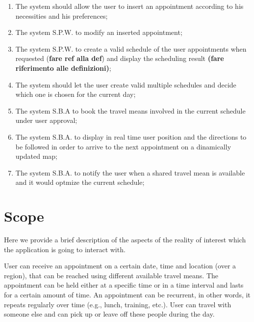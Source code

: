 \begin{enumerate}
\item The system should allow the user to insert an appointment according to his necessities and his preferences;
\label{goal:G1}

\item The system S.P.W. to modify an inserted appointment;
\label{goal:G2} 

\item The system S.P.W. to create a valid schedule of the user appointments when requested (\textbf{fare ref alla def}) and display the scheduling result \textbf{(fare riferimento alle definizioni)};
\label{goal:G3}

\item The system should let the user create valid multiple schedules and decide which one is chosen for the current day;
\label{goal:G4}

\item The system S.B.A to book the travel means involved in the current schedule under user approval;
\label{goal:G7} 

\item The system S.B.A. to display in real time user position and the directions to be followed in order to arrive to the next appointment on a dinamically updated map; \label{G8}

\item The system S.B.A. to notify the user when a shared travel mean is available and it would optmize the current schedule; \label{G10}

\end{enumerate}


\section{Scope}

Here we provide a brief description of the aspects of the reality of interest which the application is going to interact with.

User can receive an appointment on a certain date, time and location (over a region), that can be reached using different available travel means. The appointment can be held either at a specific time or in a time interval and lasts for a certain amount of time. An appointment can be recurrent, in other words, it repeats regularly over time (e.g., lunch, training, etc.). User can travel with someone else and can pick up or leave off these people during the day.

